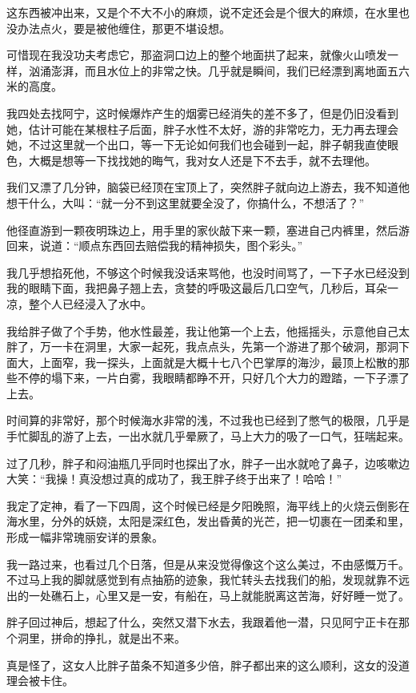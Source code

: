 这东西被冲出来，又是个不大不小的麻烦，说不定还会是个很大的麻烦，在水里也没办法点火，要是被他缠住，那更不堪设想。

可惜现在我没功夫考虑它，那盗洞口边上的整个地面拱了起来，就像火山喷发一样，汹涌澎湃，而且水位上的非常之快。几乎就是瞬间，我们已经漂到离地面五六米的高度。

我四处去找阿宁，这时候爆炸产生的烟雾已经消失的差不多了，但是仍旧没看到她，估计可能在某根柱子后面，胖子水性不太好，游的非常吃力，无力再去理会她，不过这里就一个出口，等一下无论如何我们也会碰到一起，胖子朝我直使眼色，大概是想等一下找找她的晦气，我对女人还是下不去手，就不去理他。

我们又漂了几分钟，脑袋已经顶在宝顶上了，突然胖子就向边上游去，我不知道他想干什么，大叫：“就一分不到这里就要全没了，你搞什么，不想活了？”

他径直游到一颗夜明珠边上，用手里的家伙敲下来一颗，塞进自己内裤里，然后游回来，说道：“顺点东西回去赔偿我的精神损失，图个彩头。”

我几乎想掐死他，不够这个时候我没话来骂他，也没时间骂了，一下子水已经没到我的眼睛下面，我把鼻子翘上去，贪婪的呼吸这最后几口空气，几秒后，耳朵一凉，整个人已经浸入了水中。

我给胖子做了个手势，他水性最差，我让他第一个上去，他摇摇头，示意他自己太胖了，万一卡在洞里，大家一起死，我点点头，先第一个游进了那个破洞，那洞下面大，上面窄，我一探头，上面就是大概十七八个巴掌厚的海沙，最顶上松散的那些不停的塌下来，一片白雾，我眼睛都睁不开，只好几个大力的蹬踏，一下子漂了上去。

时间算的非常好，那个时候海水非常的浅，不过我也已经到了憋气的极限，几乎是手忙脚乱的游了上去，一出水就几乎晕厥了，马上大力的吸了一口气，狂喘起来。

过了几秒，胖子和闷油瓶几乎同时也探出了水，胖子一出水就呛了鼻子，边咳嗽边大笑：“我操！真没想过真的成功了，我王胖子终于出来了！哈哈！”

我定了定神，看了一下四周，这个时候已经是夕阳晚照，海平线上的火烧云倒影在海水里，分外的妖娆，太阳是深红色，发出昏黄的光芒，把一切裹在一团柔和里，形成一幅非常瑰丽安详的景象。

我一路过来，也看过几个日落，但是从来没觉得像这个这么美过，不由感慨万千。不过马上我的脚就感觉到有点抽筋的迹象，我忙转头去找我们的船，发现就靠不远出的一处礁石上，心里又是一安，有船在，马上就能脱离这苦海，好好睡一觉了。

胖子回过神后，想起了什么，突然又潜下水去，我跟着他一潜，只见阿宁正卡在那个洞里，拼命的挣扎，就是出不来。

真是怪了，这女人比胖子苗条不知道多少倍，胖子都出来的这么顺利，这女的没道理会被卡住。

